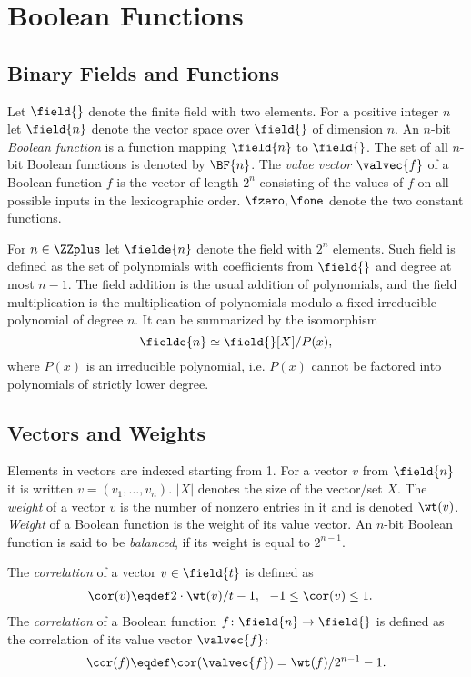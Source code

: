 \section{Boolean Functions}

\subsection{Binary Fields and Functions}
Let $\field{}$ denote the finite field with two elements. For a positive integer $n$ let $\field{n}$ denote the vector space over $\field{}$ of dimension $n$. An $n$-bit \emph{Boolean function} is a function mapping $\field{n}$ to $\field{}$. The set of all $n$-bit Boolean functions is denoted by $\BF{n}$. The \emph{value vector} $\valvec{f}$ of a Boolean function $f$ is the vector of length $2^n$ consisting of the values of $f$ on all possible inputs in the lexicographic order.
$\fzero,\fone$ denote the two constant functions.

For $n \in \ZZplus$ let $\fielde{n}$ denote the field with $2^n$ elements. Such field is defined as the set of polynomials with coefficients from $\field{}$ and degree at most $n-1$. The field addition is the usual addition of polynomials, and the field multiplication is the multiplication of polynomials modulo a fixed irreducible polynomial of degree $n$. It can be summarized by the isomorphism
$$
\fielde{n} \simeq \field{}[X]/P(x),
$$
where $P(x)$ is an irreducible polynomial, i.e. $P(x)$ cannot be factored into polynomials of strictly lower degree.

\subsection{Vectors and Weights}
Elements in vectors are indexed starting from 1. For a vector $v$ from $\field{n}$ it is written $v = (v_1, \ldots, v_n)$. $|X|$ denotes the size of the vector/set $X$. The \emph{weight} of a vector $v$ is the number of nonzero entries in it and is denoted $\wt(v)$. \emph{Weight} of a Boolean function is the weight of its value vector. An $n$-bit Boolean function is said to be \emph{balanced}, if its weight is equal to $2^{n-1}$.

The \emph{correlation} of a vector $v \in \field{t}$ is defined as
\begin{align*}
& \cor(v) \eqdef 2\cdot\wt(v)/t-1,~~ -1 \le \cor(v) \le 1.
\end{align*}
The \emph{correlation}
of a Boolean function $f\colon \field{n} \to \field{}$ is defined as the correlation
of its value vector $\valvec{f}$:
$$\cor(f) \eqdef \cor(\valvec{f}) = \wt(f)/2^{n-1}-1.$$

